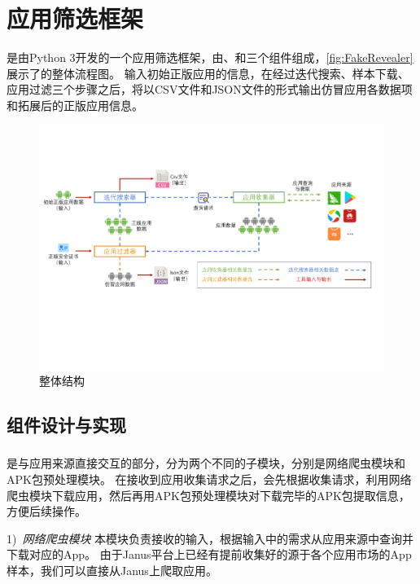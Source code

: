 \chapter{应用筛选框架\mytool}
\label{chp:fakerevealer}

\mytool 是由Python 3开发的一个应用筛选框架，由\componentA 、\componentB 和\componentC 三个组件组成，\autoref{fig:FakeRevealer}展示了\mytool 的整体流程图。
输入初始正版应用的信息，\mytool 在经过迭代搜索、样本下载、应用过滤三个步骤之后，将以CSV文件和JSON文件的形式输出仿冒应用各数据项和拓展后的正版应用信息。

\begin{figure}[htbp]
	\centering
	\includegraphics[width=\textwidth]{./Figures/edwin-fakerevealer}
	\caption{\mytool 整体结构}
	\label{fig:FakeRevealer}
	\vspace{-3mm}
\end{figure}


\section{组件设计与实现}


\subsection{\componentA }
\componentA 是与应用来源直接交互的部分，分为两个不同的子模块，分别是网络爬虫模块和APK包预处理模块。
在接收到应用收集请求之后，\componentA 会先根据收集请求，利用网络爬虫模块下载应用，然后再用APK包预处理模块对下载完毕的APK包提取信息，方便后续操作。

1)\ \emph{网络爬虫模块} \quad
本模块负责接收\componentA 的输入，根据输入中的需求从应用来源中查询并下载对应的App。
由于Janus平台上已经有提前收集好的源于各个应用市场的App样本，我们可以直接从Janus上爬取应用。

